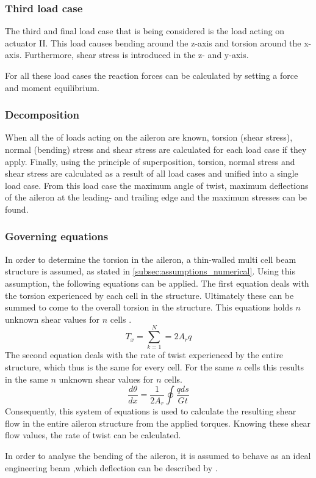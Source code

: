 \subsubsection{Third load case}
\noindent The third and final load case that is being considered is the load acting on actuator II. This load causes bending around the z-axis and torsion around the x-axis. Furthermore, shear stress is introduced in the z- and y-axis.

\noindent For all these load cases the reaction forces can be calculated by setting a force and moment equilibrium.

\subsubsection{Decomposition}
\noindent When all the of loads acting on the aileron are known, torsion (shear stress), normal (bending) stress and shear stress are calculated for each load case if they apply. Finally, using the principle of superposition, torsion, normal stress and shear stress are calculated as a result of all load cases and unified into a single load case. From this load case the maximum angle of twist, maximum deflections of the aileron at the leading- and trailing edge and the maximum stresses can be found.


\subsubsection{Governing equations}
\label{subsubsec:gov_eq_numerical}

In order to determine the torsion in the aileron, a thin-walled multi cell beam structure is assumed, as stated in \autoref{subsec:assumptions_numerical}. Using this assumption, the following equations can be applied. The first equation deals with the torsion experienced by each cell in the structure. Ultimately these can be summed to come to the overall torsion in the structure. This equations holds $n$ unknown shear values for $n$ cells \cite{the_book}.
\begin{equation}
    T_x=\sum_{k=1}^{N}=2 A_{r} q
\end{equation}
The second equation deals with the rate of twist experienced by the entire structure, which thus is the same for every cell. For the same $n$ cells this results in the same $n$ unknown shear values for $n$ cells.
\begin{equation}
    \frac{d \theta}{d x}=\frac{1}{2 A_{r}} \oint \frac{q d s}{G t}
\end{equation}
Consequently, this system of equations is used to calculate the resulting shear flow in the entire aileron structure from the applied torques. Knowing these shear flow values, the rate of twist can be calculated.\par
\noindent In order to analyse the bending of the aileron, it is assumed to behave as an ideal engineering beam ,which deflection can be described by  \cite{the_book}.

